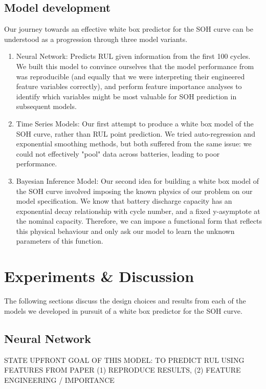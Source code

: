 \documentclass{article}
\begin{document}
\subsection{Model development}
Our journey towards an effective white box predictor for the SOH curve can be understood as a progression through three model variants. 
\begin{enumerate}
    \item Neural Network: Predicts RUL given information from the first 100 cycles. We built this model to convince ourselves that the model performance from \cite{severson2019data} was reproducible (and equally that we were interpreting their engineered feature variables correctly), and perform feature importance analyses to identify which variables might be most valuable for SOH prediction in subsequent models. \newline

    \item Time Series Models: Our first attempt to produce a white box model of the SOH curve, rather than RUL point prediction. We tried auto-regression and exponential smoothing methods, but both suffered from the same issue: we could not effectively "pool" data across batteries, leading to poor performance. \newline

    \item Bayesian Inference Model: Our second idea for building a white box model of the SOH curve involved imposing the known physics of our problem on our model specification. We know that battery discharge capacity has an exponential decay relationship with cycle number, and a fixed y-asymptote at the nominal capacity. Therefore, we can impose a functional form that reflects this physical behaviour and only ask our model to learn the unknown parameters of this function.
\end{enumerate}

\section{Experiments \& Discussion}
The following sections discuss the design choices and results from each of the models we developed in pursuit of a white box predictor for the SOH curve. 

\subsection{Neural Network}
STATE UPFRONT GOAL OF THIS MODEL: TO PREDICT RUL USING FEATURES FROM PAPER
(1) REPRODUCE RESULTS, (2) FEATURE ENGINEERING / IMPORTANCE
\end{document}
